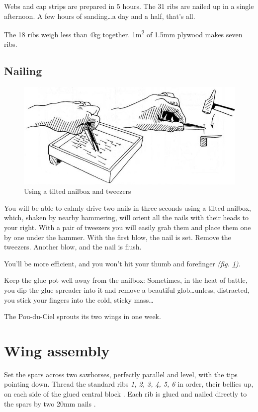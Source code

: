 \documentclass{book}
\newcommand*\circled[1]{\tikz[baseline=(char.base)]{
    \node[shape=circle,draw,inner sep=1pt] (char) {#1};}}
\begin{document}
Webs and cap strips are prepared in 5 hours.  The 31 ribs are nailed
up in a single afternoon.  A few hours of sanding\ldots a day and a
half, that's all.

The 18 ribs weigh less than 4kg together.  1m\textsuperscript{2} of
1.5mm plywood makes seven ribs.

\subsection{Nailing}

\begin{figure}
  \includegraphics[width=\linewidth]{fig-45.jpg}
  \caption{Using a tilted nailbox and tweezers}
  \label{fig:fortyfive}
\end{figure}

You will be able to calmly drive two nails in three seconds using a
tilted nailbox, which, shaken by nearby hammering, will orient all the
nails with their heads to your right.  With a pair of tweezers you
will easily grab them and place them one by one under the hammer.
With the first blow, the nail is set.  Remove the tweezers.  Another
blow, and the nail is flush.

You'll be more efficient, and you won't hit your thumb and forefinger
\textit{(fig. \ref{fig:fortyfive})}.

Keep the glue pot well away from the nailbox: Sometimes, in the heat
of battle, you dip the glue spreader into it and remove a beautiful
glob\ldots unless, distracted, you stick your fingers into the cold,
sticky mass\ldots

The Pou-du-Ciel sprouts its two wings in one week.

\section{Wing assembly}

Set the spars across two sawhorses, perfectly parallel and level, with
the tips pointing down.  Thread the standard ribs \textit{1, 2, 3, 4,
  5, 6} in order, their bellies up, on each side of the glued central
block \circled{204}.  Each rib is glued and nailed directly to the
spars by two 20mm nails \circled{230}.
\end{document}
